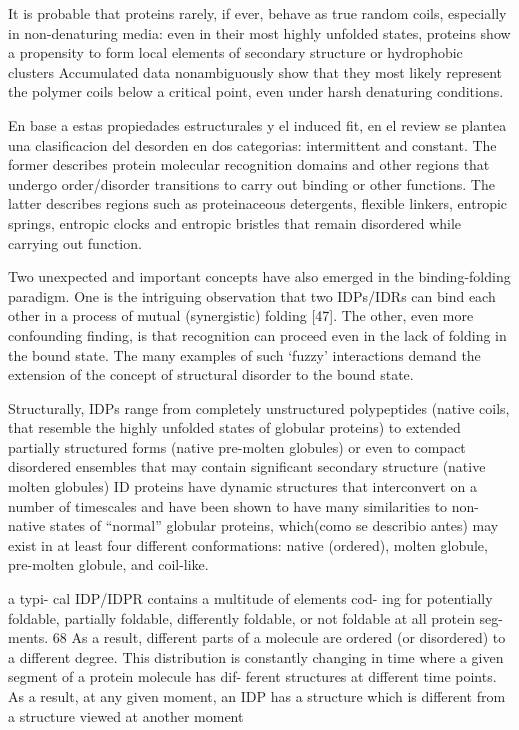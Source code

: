 It is probable that proteins rarely, if ever, behave as true random coils, especially in non-denaturing media: even in their most highly unfolded states, proteins show a propensity to form local elements of secondary structure or hydrophobic clusters
Accumulated data nonambiguously show that they most likely represent the polymer coils below a critical point, even under harsh denaturing conditions.




En base a estas propiedades estructurales y el induced fit, en el review \cite{dunker2001intrinsically} se plantea una clasificacion del desorden en dos categorias: intermittent and constant.
The former describes protein molecular recognition domains and other regions that undergo order/disorder transitions to carry out binding or other functions. The latter describes regions such as
proteinaceous detergents, flexible linkers, entropic springs, entropic clocks and entropic bristles that remain disordered while carrying out function.

Two unexpected and important concepts have also emerged in the binding-folding paradigm. One is the intriguing observation that two IDPs/IDRs can bind each other in a process of mutual (synergistic) folding [47].
The other, even more confounding finding, is that recognition can proceed even in the lack of folding in the bound state. 
The many examples of such ‘fuzzy’ interactions demand the extension of the concept of structural disorder to the bound state.



Structurally, IDPs range from completely unstructured polypeptides (native coils, that resemble the highly unfolded states of globular proteins) to extended partially structured forms (native pre-molten globules) or even to compact disordered ensembles that may contain significant secondary structure (native molten globules)
ID proteins have dynamic structures that interconvert on a number of timescales and have been shown to have many similarities to non-native states of “normal” globular proteins, which(como se describio antes) may exist in at least four different conformations: native (ordered), molten globule, pre-molten globule, and coil-like.

a typi-
cal IDP/IDPR contains a multitude of elements cod-
ing for potentially foldable, partially foldable,
differently foldable, or not foldable at all protein seg-
ments. 68 As a result, different parts of a molecule
are ordered (or disordered) to a different degree.
This distribution is constantly changing in time
where a given segment of a protein molecule has dif-
ferent structures at different time points. As a
result, at any given moment, an IDP has a structure
which is different from a structure viewed at
another moment

